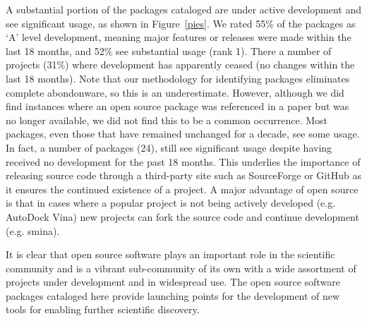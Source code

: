 A substantial portion of the packages cataloged are under active development and see significant usage, as shown in Figure~\ref{pies}.  We rated 55\% of the packages as `A' level development, meaning major features or releases were made within the last 18 months, and 52\% see substantial usage (rank 1).  
There a number of projects (31\%) where development has apparently ceased (no changes within the last 18 months). Note that our methodology for identifying packages eliminates complete abondonware, so this is an underestimate.  However, although we did find instances where an open source package was referenced in a paper but was no longer available, we did not find this to be a common occurrence.  Most packages, even those that have remained unchanged for a decade, see some usage.  In fact, a number of packages (24), still see significant usage despite having received no development for the past 18 months.  This underlies the importance of releasing source code through a third-party site such as SourceForge or GitHub as it ensures the continued existence of a project.  A major advantage of open source is that in cases where a popular project is not being actively developed (e.g. AutoDock Vina) new projects can fork the source code and continue development (e.g. smina).

It is clear that open source software plays an important role in the scientific community and is a vibrant sub-community of its own with a wide assortment of projects under development and in widespread use.  The open source software packages cataloged here provide launching points for the development of new tools for enabling further scientific discovery.
